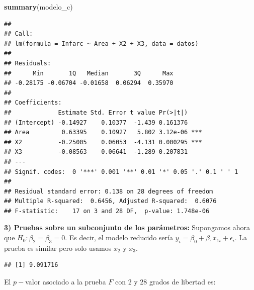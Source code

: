 \documentclass[
]{book}
\newenvironment{Shaded}{\begin{snugshade}}{\end{snugshade}}
\newcommand{\AttributeTok}[1]{\textcolor[rgb]{0.13,0.29,0.53}{#1}}
\newcommand{\DecValTok}[1]{\textcolor[rgb]{0.00,0.00,0.81}{#1}}
\newcommand{\FunctionTok}[1]{\textcolor[rgb]{0.13,0.29,0.53}{\textbf{#1}}}
\newcommand{\NormalTok}[1]{#1}
\newcommand{\OtherTok}[1]{\textcolor[rgb]{0.56,0.35,0.01}{#1}}
\newcommand{\SpecialCharTok}[1]{\textcolor[rgb]{0.81,0.36,0.00}{\textbf{#1}}}
\newcommand{\StringTok}[1]{\textcolor[rgb]{0.31,0.60,0.02}{#1}}
\begin{document}
\begin{Shaded}
\begin{Highlighting}[]
\FunctionTok{summary}\NormalTok{(modelo\_c)}
\end{Highlighting}
\end{Shaded}

\begin{verbatim}
## 
## Call:
## lm(formula = Infarc ~ Area + X2 + X3, data = datos)
## 
## Residuals:
##      Min       1Q   Median       3Q      Max 
## -0.28175 -0.06704 -0.01658  0.06294  0.35970 
## 
## Coefficients:
##             Estimate Std. Error t value Pr(>|t|)    
## (Intercept) -0.14927    0.10377  -1.439 0.161376    
## Area         0.63395    0.10927   5.802 3.12e-06 ***
## X2          -0.25005    0.06053  -4.131 0.000295 ***
## X3          -0.08563    0.06641  -1.289 0.207831    
## ---
## Signif. codes:  0 '***' 0.001 '**' 0.01 '*' 0.05 '.' 0.1 ' ' 1
## 
## Residual standard error: 0.138 on 28 degrees of freedom
## Multiple R-squared:  0.6456, Adjusted R-squared:  0.6076 
## F-statistic:    17 on 3 and 28 DF,  p-value: 1.748e-06
\end{verbatim}

\textbf{3) Pruebas sobre un subconjunto de los parámetros:} Supongamos ahora que \(H_0:\beta_2=\beta_3=0\). Es decir, el modelo reducido sería \(y_i = \beta_0+ \beta_1x_{1i}+\epsilon_i\). La prueba es similar pero solo usamos \(x_2\) y \(x_3\).

\begin{Shaded}
\end{Shaded}

\begin{verbatim}
## [1] 9.091716
\end{verbatim}

El \(p-\)valor asociado a la prueba \(F\) con 2 y 28 grados de libertad es:
\end{document}
